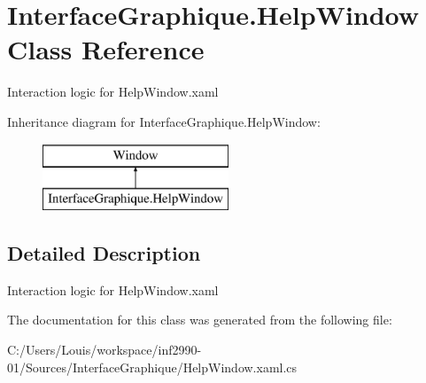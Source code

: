 \hypertarget{class_interface_graphique_1_1_help_window}{}\section{Interface\+Graphique.\+Help\+Window Class Reference}
\label{class_interface_graphique_1_1_help_window}


Interaction logic for Help\+Window.\+xaml  


Inheritance diagram for Interface\+Graphique.\+Help\+Window\+:\begin{figure}[H]
\begin{center}
\leavevmode
\includegraphics[height=2.000000cm]{class_interface_graphique_1_1_help_window}
\end{center}
\end{figure}


\subsection{Detailed Description}
Interaction logic for Help\+Window.\+xaml 



The documentation for this class was generated from the following file\+:\begin{DoxyCompactItemize}
\item 
C\+:/\+Users/\+Louis/workspace/inf2990-\/01/\+Sources/\+Interface\+Graphique/Help\+Window.\+xaml.\+cs\end{DoxyCompactItemize}
